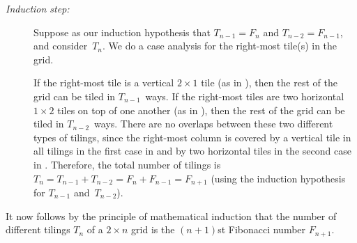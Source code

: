 \documentclass{jn-pset}
\begin{document}
\begin{problem}
\begin{solution}
\begin{description}

    
  \item[\emph{Induction step:}]
    Suppose as our induction hypothesis that
    $T_{n-1} = F_{n}$
    and
    $T_{n-2} = F_{n-1}$,
    and consider~$T_n$.
    We do a case analysis for the right-most tile(s) in the grid.
    
    If the right-most tile is a vertical $2 \times 1$ tile
    (as in
    ),
    then the rest of the grid can be tiled in
    $T_{n-1}$~ways.
    If the right-most tiles are two horizontal
    $1 \times 2$ tiles on top of one another
    (as in
    ),
    then the rest of the grid can be tiled in
    $T_{n-2}$~ways.
    There are no overlaps between these two different types of tilings,
    since the right-most column is covered by a vertical tile
    in all tilings in the first case in 
    and by two horizontal tiles in the second case
    in
    .
    Therefore, the total number of tilings is
    $
    T_n =
    T_{n-1} + T_{n-2} =
    F_{n} + F_{n-1} =
    F_{n+1}
    $
    (using the induction hypothesis for
    $T_{n-1}$ and~$T_{n-2}$).
  \end{description}
  It now follows by the principle of mathematical induction that the
  number of different tilings
  $T_n$ of a $2 \times n$ grid
  is the $(n+1)$st Fibonacci number
  $F_{n+1}$.
\end{solution}

\end{problem}


\end{document}
